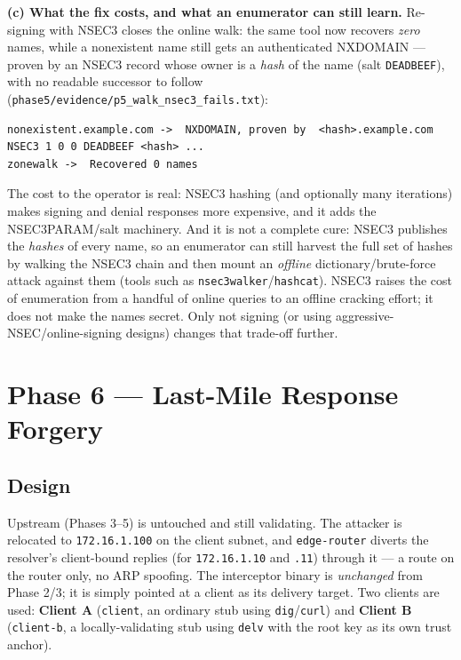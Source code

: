 \documentclass[11pt,a4paper]{article}
\begin{document}
\textbf{(c) What the fix costs, and what an enumerator can still learn.} Re-signing with NSEC3
closes the online walk: the same tool now recovers \emph{zero} names, while a nonexistent name still
gets an authenticated NXDOMAIN --- proven by an NSEC3 record whose owner is a \emph{hash} of the name
(salt \texttt{DEADBEEF}), with no readable successor to follow
(\texttt{phase5/evidence/p5\_walk\_nsec3\_fails.txt}):
\begin{lstlisting}
nonexistent.example.com ->  NXDOMAIN, proven by  <hash>.example.com NSEC3 1 0 0 DEADBEEF <hash> ...
zonewalk ->  Recovered 0 names
\end{lstlisting}
The cost to the operator is real: NSEC3 hashing (and optionally many iterations) makes signing and
denial responses more expensive, and it adds the NSEC3PARAM/salt machinery. And it is not a complete
cure: NSEC3 publishes the \emph{hashes} of every name, so an enumerator can still harvest the full
set of hashes by walking the NSEC3 chain and then mount an \emph{offline} dictionary/brute-force
attack against them (tools such as \texttt{nsec3walker}/\texttt{hashcat}). NSEC3 raises the cost of
enumeration from a handful of online queries to an offline cracking effort; it does not make the
names secret. Only not signing (or using aggressive-NSEC/online-signing designs) changes that
trade-off further.


\section{Phase 6 --- Last-Mile Response Forgery}

\subsection{Design}
Upstream (Phases 3--5) is untouched and still validating. The attacker is relocated to
\texttt{172.16.1.100} on the client subnet, and \texttt{edge-router} diverts the resolver's
client-bound replies (for \texttt{172.16.1.10} and \texttt{.11}) through it --- a route on the router
only, no ARP spoofing. The interceptor binary is \emph{unchanged} from Phase 2/3; it is simply
pointed at a client as its delivery target. Two clients are used: \textbf{Client A} (\texttt{client},
an ordinary stub using \texttt{dig}/\texttt{curl}) and \textbf{Client B} (\texttt{client-b}, a
locally-validating stub using \texttt{delv} with the root key as its own trust anchor).
\end{document}
